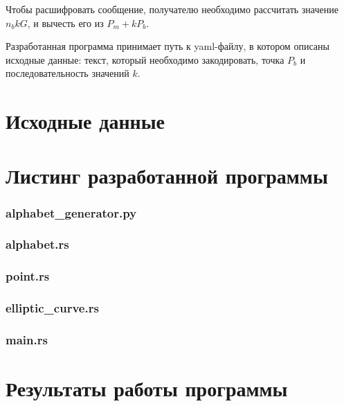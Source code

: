 \documentclass[12pt, a4paper]{article}
\begin{document}
Чтобы расшифровать сообщение, получателю необходимо рассчитать значение $n_bkG$,
и вычесть его из $P_m + kP_b$.

Разработанная программа принимает путь к yaml-файлу, в котором описаны исходные
данные: текст, который необходимо закодировать, точка $P_b$ и последовательность
значений $k$.

\section*{Исходные данные}



\section*{Листинг разработанной программы}

\subsubsection*{alphabet\_generator.py}



\subsubsection*{alphabet.rs}



\subsubsection*{point.rs}



\subsubsection*{elliptic\_curve.rs}



\subsubsection*{main.rs}



\section*{Результаты работы программы}
\end{document}
